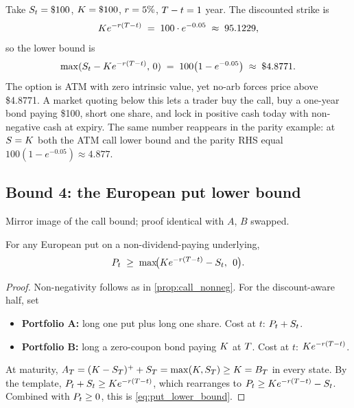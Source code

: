 Take $S_t = \$100$, $K = \$100$, $r = 5\%$,
$T - t = 1$ year. The discounted strike is
\begin{equation*}
  K e^{-r(T - t)}
  \;=\; 100 \cdot e^{-0.05}
  \;\approx\; 95.1229,
\end{equation*}
so the lower bound is
\begin{equation*}
  \max(S_t - K e^{-r(T - t)},\, 0)
  \;=\; 100\bigl(1 - e^{-0.05}\bigr)
  \;\approx\; \$4.8771.
\end{equation*}
The option is ATM with zero intrinsic value, yet no-arb forces
price above \$4.8771. A market quoting below this lets a trader
buy the call, buy a one-year bond paying \$100, short one share,
and lock in positive cash today with non-negative cash at expiry.
The same number reappears in the parity example: at
$S = K$ both the ATM call lower bound and the parity
RHS equal $100(1 - e^{-0.05}) \approx 4.877$.

\subsection{Bound 4: the European put lower bound}
\label{sec:ch14_bound4}

Mirror image of the call bound; proof identical with $A$, $B$
swapped.

\begin{proposition}
\label{prop:put_lower_bound}
For any European put on a non-dividend-paying underlying,
\begin{equation}
  P_t \;\geq\; \max\!\bigl(K e^{-r(T - t)} - S_t,\;\, 0\bigr).
  \label{eq:put_lower_bound}
\end{equation}
\end{proposition}

\begin{proof}
Non-negativity follows as in \cref{prop:call_nonneg}. For the
discount-aware half, set
\begin{itemize}
  \item \textbf{Portfolio A:} long one put plus long one share.
  Cost at $t$: $P_t + S_t$.
  \item \textbf{Portfolio B:} long a zero-coupon bond paying
  $K$ at $T$. Cost at $t$:
  $K e^{-r(T-t)}$.
\end{itemize}
At maturity, $A_T = (K - S_T)^+ + S_T =
\max(K, S_T) \geq K = B_T$ in every state. By
the template, $P_t + S_t \geq K e^{-r(T-t)}$,
which rearranges to
$P_t \geq K e^{-r(T-t)} - S_t$. Combined
with $P_t \geq 0$, this is \eqref{eq:put_lower_bound}.
\end{proof}

